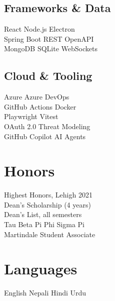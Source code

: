 \documentclass[]{deedy-resume-openfont}
\begin{document}
\begin{minipage}[t]{0.30\textwidth}
\subsection{Frameworks \& Data}
React \textbullet{} Node.js \textbullet{} Electron \\
Spring Boot \textbullet{} REST \textbullet{} OpenAPI \\
MongoDB \textbullet{} SQLite \textbullet{} WebSockets \\
\sectionsep
\subsection{Cloud \& Tooling}
Azure \textbullet{} Azure DevOps \\
GitHub Actions \textbullet{} Docker \\
Playwright \textbullet{} Vitest \\
OAuth 2.0 \textbullet{} Threat Modeling \\
GitHub Copilot \textbullet{} AI Agents \\
\sectionsep

\section{Honors}
Highest Honors, Lehigh 2021 \\
Dean's Scholarship (4 years) \\
Dean's List, all semesters \\
Tau Beta Pi \textbullet{} Phi Sigma Pi \\
Martindale Student Associate \\
\sectionsep

\section{Languages}
English \textbullet{} Nepali \textbullet{} Hindi \textbullet{} Urdu

\end{minipage}
\hfill
\end{document}
